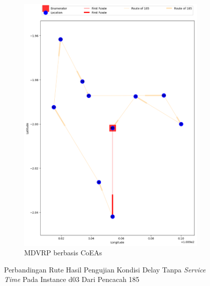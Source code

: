 \begin{figure}[H]
	\centering
	\begin{subfigure}[t]{\textwidth}
		\centering
		\includegraphics[width=\textwidth]{Resources/Images/delayed_3/real_m15_n100_delayed_3_185_coes}
		\caption{MDVRP berbasis CoEAs}
		\label{fig:real_m15_n100_delayed_3_185_coes}
	\end{subfigure}
	\caption{Perbandingan Rute Hasil Pengujian Kondisi Delay Tanpa \textit{Service Time} Pada Instance d03 Dari Pencacah 185}
	\label{fig:real_m15_n100_delayed_3_185}
\end{figure}


